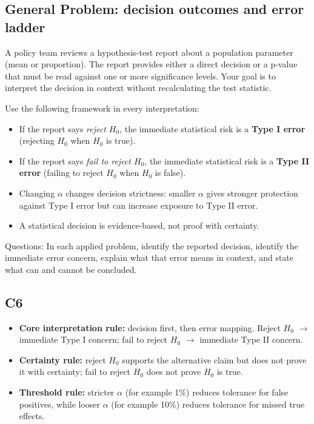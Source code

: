 \begin{ExamProblems}

\item
\section{General Problem: decision outcomes and error ladder}
A policy team reviews a hypothesis-test report about a population parameter (mean or proportion). The report provides either a direct decision or a p-value that must be read against one or more significance levels. Your goal is to interpret the decision in context without recalculating the test statistic.

Use the following framework in every interpretation:
\begin{itemize}
    \item If the report says \textit{reject \(H_0\)}, the immediate statistical risk is a \textbf{Type I error} (rejecting \(H_0\) when \(H_0\) is true).
    \item If the report says \textit{fail to reject \(H_0\)}, the immediate statistical risk is a \textbf{Type II error} (failing to reject \(H_0\) when \(H_0\) is false).
    \item Changing \(\alpha\) changes decision strictness: smaller \(\alpha\) gives stronger protection against Type I error but can increase exposure to Type II error.
    \item A statistical decision is evidence-based, not proof with certainty.
\end{itemize}

Questions: In each applied problem, identify the reported decision, identify the immediate error concern, explain what that error means in context, and state what can and cannot be concluded.

\subsection*{C6}
\begin{itemize}
    \item \textbf{Core interpretation rule:} decision first, then error mapping. Reject \(H_0\) $\rightarrow$ immediate Type I concern; fail to reject \(H_0\) $\rightarrow$ immediate Type II concern.
    \item \textbf{Certainty rule:} reject \(H_0\) supports the alternative claim but does not prove it with certainty; fail to reject \(H_0\) does not prove \(H_0\) is true.
    \item \textbf{Threshold rule:} stricter \(\alpha\) (for example 1\%) reduces tolerance for false positives, while looser \(\alpha\) (for example 10\%) reduces tolerance for missed true effects.
\end{itemize}


\end{ExamProblems}
